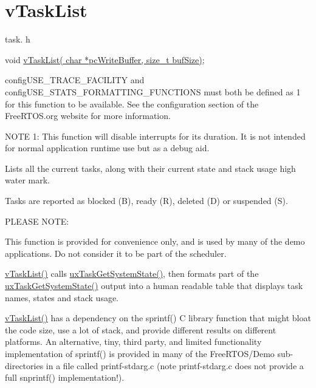 \hypertarget{group__v_task_list}{}\section{v\+Task\+List}
\label{group__v_task_list}
task. h 
\begin{DoxyPre}void \hyperlink{task_8h_a80bc218de93d840e29ea0b4387b651c4}{vTaskList( char *pcWriteBuffer, size\_t bufSize)};\end{DoxyPre}


config\+U\+S\+E\+\_\+\+T\+R\+A\+C\+E\+\_\+\+F\+A\+C\+I\+L\+I\+TY and config\+U\+S\+E\+\_\+\+S\+T\+A\+T\+S\+\_\+\+F\+O\+R\+M\+A\+T\+T\+I\+N\+G\+\_\+\+F\+U\+N\+C\+T\+I\+O\+NS must both be defined as 1 for this function to be available. See the configuration section of the Free\+R\+T\+O\+S.\+org website for more information.

N\+O\+TE 1\+: This function will disable interrupts for its duration. It is not intended for normal application runtime use but as a debug aid.

Lists all the current tasks, along with their current state and stack usage high water mark.

Tasks are reported as blocked (\textquotesingle{}B\textquotesingle{}), ready (\textquotesingle{}R\textquotesingle{}), deleted (\textquotesingle{}D\textquotesingle{}) or suspended (\textquotesingle{}S\textquotesingle{}).

P\+L\+E\+A\+SE N\+O\+TE\+:

This function is provided for convenience only, and is used by many of the demo applications. Do not consider it to be part of the scheduler.

\hyperlink{task_8h_a80bc218de93d840e29ea0b4387b651c4}{v\+Task\+List()} calls \hyperlink{task_8h_aa4603f3de3d809e9beb18d10fbac005d}{ux\+Task\+Get\+System\+State()}, then formats part of the \hyperlink{task_8h_aa4603f3de3d809e9beb18d10fbac005d}{ux\+Task\+Get\+System\+State()} output into a human readable table that displays task names, states and stack usage.

\hyperlink{task_8h_a80bc218de93d840e29ea0b4387b651c4}{v\+Task\+List()} has a dependency on the sprintf() C library function that might bloat the code size, use a lot of stack, and provide different results on different platforms. An alternative, tiny, third party, and limited functionality implementation of sprintf() is provided in many of the Free\+R\+T\+O\+S/\+Demo sub-\/directories in a file called printf-\/stdarg.\+c (note printf-\/stdarg.\+c does not provide a full snprintf() implementation!).

